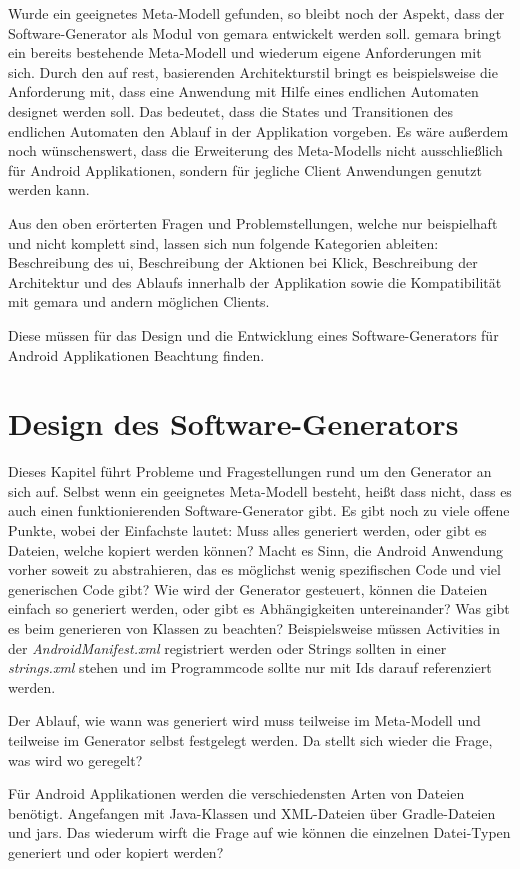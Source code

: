 Wurde ein geeignetes Meta-Modell gefunden, so bleibt noch der Aspekt, dass der Software-Generator als Modul von \acf{gemara} entwickelt werden soll. \acs{gemara} bringt ein bereits bestehende Meta-Modell und wiederum eigene Anforderungen mit sich. Durch den auf \acf{rest}, basierenden Architekturstil bringt es beispielsweise die Anforderung mit, dass eine Anwendung mit Hilfe eines endlichen Automaten designet werden soll. Das bedeutet, dass die States und Transitionen des endlichen Automaten den Ablauf in der Applikation vorgeben.
Es wäre außerdem noch wünschenswert, dass die Erweiterung des Meta-Modells nicht ausschließlich für Android Applikationen, sondern für jegliche Client Anwendungen genutzt werden kann.

Aus den oben erörterten Fragen und Problemstellungen, welche nur beispielhaft und nicht komplett sind, lassen sich nun folgende Kategorien ableiten: Beschreibung des \acl{ui}, Beschreibung der Aktionen bei Klick, Beschreibung der Architektur und des Ablaufs innerhalb der Applikation sowie die Kompatibilität mit \acs{gemara} und andern möglichen Clients. 

Diese müssen für das Design und die Entwicklung eines Software-Generators für Android Applikationen Beachtung finden.

\section{Design des Software-Generators}

Dieses Kapitel führt Probleme und Fragestellungen rund um den Generator an sich auf. Selbst wenn ein geeignetes Meta-Modell besteht, heißt dass nicht, dass es auch einen funktionierenden Software-Generator gibt. Es gibt noch zu viele offene Punkte, wobei der Einfachste lautet: Muss alles generiert werden, oder gibt es Dateien, welche kopiert werden können? Macht es Sinn, die Android Anwendung vorher soweit zu abstrahieren, das es möglichst wenig spezifischen Code und viel generischen Code gibt? Wie wird der Generator gesteuert, können die Dateien einfach so generiert werden, oder gibt es Abhängigkeiten untereinander? Was gibt es beim generieren von Klassen zu beachten? Beispielsweise müssen Activities in der \textit{AndroidManifest.xml} registriert werden oder Strings sollten in einer \textit{strings.xml} stehen und im Programmcode sollte nur mit Ids darauf referenziert werden.

Der Ablauf, wie wann was generiert wird muss teilweise im Meta-Modell und teilweise im Generator selbst festgelegt werden. Da stellt sich wieder die Frage, was wird wo geregelt? 

Für Android Applikationen werden die verschiedensten Arten von Dateien benötigt. Angefangen mit Java-Klassen und XML-Dateien über Gradle-Dateien und \acfp{jar}.
Das wiederum wirft die Frage auf wie können die einzelnen Datei-Typen generiert und oder kopiert werden?
